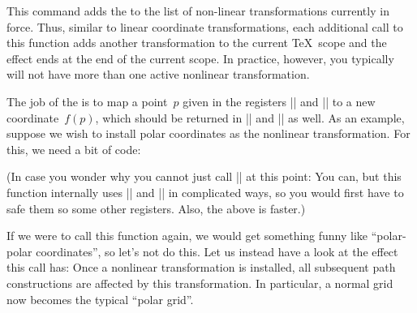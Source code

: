 \begin{command}{\pgftransformnonlinear{}}
    This command adds the  to the list of non-linear
    transformations currently in force. Thus, similar to linear coordinate
    transformations, each additional call to this function adds another
    transformation to the current \TeX\ scope and the effect ends at the end of
    the current scope. In practice, however, you typically will not have more
    than one active nonlinear transformation.

    The job of the  is to map a point~$p$ given in
    the registers |\pgf@x| and |\pgf@y| to a new coordinate~$f(p)$, which
    should be returned in |\pgf@x| and |\pgf@y| as well. As an example, suppose
    we wish to install polar coordinates as the nonlinear transformation. For
    this, we need a bit of code:
\begin{codeexample}
\def\polartransformation{%
  \pgfmathsincos@{\pgf@sys@tonumber\pgf@x}%
  \pgf@x=\pgfmathresultx\pgf@y%
  \pgf@y=\pgfmathresulty\pgf@y%
}
\end{codeexample}
    (In case you wonder why you cannot just call |\pgfpointpolar| at this
    point: You can, but this function internally uses |\pgf@x| and |\pgf@y| in
    complicated ways, so you would first have to safe them so some other
    registers. Also, the above is faster.)

    If we were to call this function again, we would get something funny like
    ``polar-polar coordinates'', so let's not do this. Let us instead have a
    look at the effect this call has: Once a nonlinear transformation is
    installed, all subsequent path constructions are affected by this
    transformation. In particular, a normal grid now becomes the typical
    ``polar grid''.
\begin{codeexample}[]
\end{codeexample}
\end{command}


